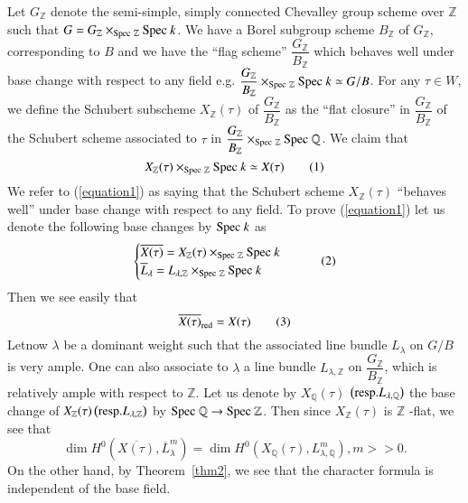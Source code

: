 \begin{rem}\label{rem3}
Let $G_{\mathbb{Z}}$ denote the semi-simple, simply connected Chevalley group scheme over $\mathbb{Z}$ such that $G=G_{\mathbb{Z}}\times _{\spec\ \mathbb{Z}}\spec\ k$. We have a Borel subgroup scheme $B_{\mathbb{Z}}$ of $G_{\mathbb{Z}}$, corresponding to $B$ and we have the ``flag scheme'' $\dfrac{G_{\mathbb{Z}}}{B_{\mathbb{Z}}}$ which behaves well under base change with respect to any field e.g. $\dfrac{G_{\mathbb{Z}}}{B_{\mathbb{Z}}}\times_{\spec\ \mathbb{Z}} \spec\ k\simeq G/B$. For any $\tau\in W$, we define the Schubert subscheme $X_{\mathbb{Z}}(\tau)$ of $\dfrac{G_{\mathbb{Z}}}{B_{\mathbb{Z}}}$ as the ``flat closure'' in $\dfrac{G_{\mathbb{Z}}}{B_{\mathbb{Z}}}$ of the Schubert scheme associated to $\tau$ in $\dfrac{G_{\mathbb{Z}}}{B_{\mathbb{Z}}}\times _{\mathrm{Spec}\ \mathbb{Z}}\mathrm{Spec}\ \mathbb{Q}$. We claim that 
\begin{equation*}\label{equation1}
X_{\mathbb{Z}}(\tau)\times_{\mathrm{Spec}\ \mathbb{Z}}\mathrm{Spec}\ k \simeq X(\tau)\tag{1}
\end{equation*}
We refer to (\ref{equation1}) as saying that the Schubert scheme $X_{\mathbb{Z}}(\tau)$ ``behaves well'' under base change with respect to any field. To prove (\ref{equation1}) let us denote the following base changes by $\mathrm{Spec}\ k$ as 
\begin{equation*}\label{equation2}
\begin{cases}
\overline{X(\tau)}=X_{\mathbb{Z}}(\tau)\times_{\spec\ \mathbb{Z}}\spec\ k\\
\overline{L}_{\lambda} = L_{\lambda, \mathbb{Z}}\times_{\spec\ \mathbb{Z}} \spec\ k 
\end{cases}\tag{2}
\end{equation*}
Then we see easily that 
\begin{equation*}\label{equation3}
\overline{X(\tau)}_{\mathrm{red}}=X(\tau)\tag{3}
\end{equation*}
Let\pageoriginale now $\lambda$ be a dominant weight such that the
associated line bundle $L_{\lambda}$ on $G/B$ is very ample. One can
also associate to $\lambda$ a line bundle $L_{\lambda, \mathbb{Z}}$ on
$\dfrac{G_{\mathbb{Z}}}{B_{\mathbb{Z}}}$, which is relatively ample
with respect to $\mathbb{Z}$. Let us denote by $X_{\mathbb{Q}}(\tau)$
$\left(\mathrm{resp.} L_{\lambda, \mathbb{Q}}\right)$ the base change of
$X_{\mathbb{Z}}(\tau)\left(\mathrm{resp.}  L_{\lambda, \mathbb{Z}}\right)$ by $\spec\ \mathbb{Q}\to \spec\ \mathbb{Z}$. Then since $X_{\mathbb{Z}}(\tau)$ is $\mathbb{Z}$ -flat, we see that 
\begin{equation*}\label{equation4}
\dim H^{0}\left(\overline{X(\tau)}, \overline{L}^{m}_{\lambda}\right)=\dim H^{0}\left(X_{\mathbb{Q}}(\tau), L^{m}_{\lambda, \mathbb{Q}}\right), m>> 0. \tag{4}
\end{equation*}
On the other hand, by Theorem~\ref{thm2}, we see that the character formula is independent of the base field. 


\end{rem}
